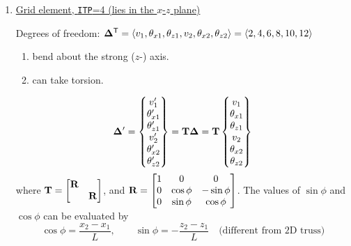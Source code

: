 \begin{enumerate}[leftmargin=*]
  \item \underline{Grid element, \texttt{ITP}=4 (lies in the $x$-$z$ plane)}\\
    \begin{minipage}[t]{0.6\linewidth}
      Degrees of freedom:
      $\bm{\Delta}^{\mathsf{T}} = \langle v_1, \theta_{x1}, \theta_{z1}, v_2, \theta_{x2}, \theta_{z2}\rangle = \langle 2, 4, 6, 8, 10, 12\rangle$
      \begin{enumerate}[label=(\arabic*)]
        \item bend about the strong ($z$-) axis.
        \item can take torsion.
      \end{enumerate}
    \end{minipage}\hfill
    \begin{minipage}[t]{0.36\linewidth}
      \vspace{0pt}\centering
    \end{minipage}
    \begin{equation*}
      \bm{\Delta}' = \begin{Bmatrix}v_1'\\ \theta_{x1}'\\ \theta_{z1}'\\ v_2'\\ \theta_{x2}'\\ \theta_{z2}'\end{Bmatrix} = \mathbf{T}\bm{\Delta} = \mathbf{T}\begin{Bmatrix}v_1\\ \theta_{x1}\\ \theta_{z1}\\ v_2\\ \theta_{x2}\\ \theta_{z2}\end{Bmatrix}
    \end{equation*}
    where $\mathbf{T} = \begin{bmatrix}\mathbf{R} & \\ & \mathbf{R}\end{bmatrix}$, and $\mathbf{R} = \begin{bmatrix}1 & 0 & 0\\ 0 & \cos\phi & -\sin\phi\\ 0 & \sin\phi & \cos\phi\end{bmatrix}$. The values of $\sin\phi$ and $\cos\phi$ can be evaluated by
    \begin{equation*}
      \cos\phi = \frac{x_2-x_1}{L},\qquad \sin\phi = -\frac{z_2-z_1}{L}\quad\text{(different from 2D truss)}
    \end{equation*}


\end{enumerate}
